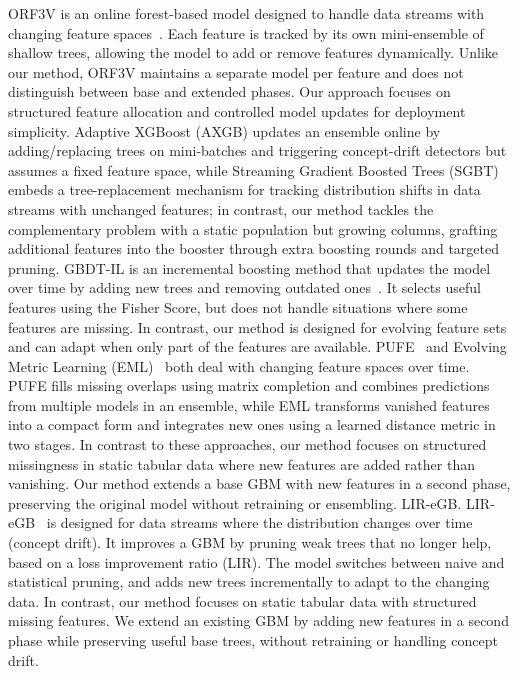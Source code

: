 \documentclass[sigconf]{acmart}
\begin{document}
\begin{itemize}
ORF3V is an online forest-based model designed to handle data streams with changing feature spaces~\cite{beyazit2019orf3v}. Each feature is tracked by its own mini-ensemble of shallow trees, allowing the model to add or remove features dynamically. Unlike our method, ORF3V maintains a separate model per feature and does not distinguish between base and extended phases. Our approach focuses on structured feature allocation and controlled model updates for deployment simplicity.
Adaptive XGBoost (AXGB)\cite{montiel2020axgb} updates an ensemble online by adding/replacing trees on mini-batches and triggering concept-drift detectors but assumes a fixed feature space, while Streaming Gradient Boosted Trees (SGBT)\cite{vaquet2022sgbt} embeds a tree-replacement mechanism for tracking distribution shifts in data streams with unchanged features; in contrast, our method tackles the complementary problem with a static population but growing columns, grafting additional features into the booster through extra boosting rounds and targeted pruning.
GBDT-IL is an incremental boosting method that updates the model over time by adding new trees and removing outdated ones~\cite{chen2024gbdtil}. It selects useful features using the Fisher Score, but does not handle situations where some features are missing. In contrast, our method is designed for evolving feature sets and can adapt when only part of the features are available.
PUFE~\cite{he2021pufe} and Evolving Metric Learning (EML)~\cite{dong2021eml} both deal with changing feature spaces over time. PUFE fills missing overlaps using matrix completion and combines predictions from multiple models in an ensemble, while EML transforms vanished features into a compact form and integrates new ones using a learned distance metric in two stages. In contrast to these approaches, our method focuses on structured missingness in static tabular data where new features are added rather than vanishing. Our method extends a base GBM with new features in a second phase, preserving the original model without retraining or ensembling.
LIR-eGB. LIR-eGB~\cite{wang2023liregb} is designed for data streams where the distribution changes over time (concept drift). It improves a GBM by pruning weak trees that no longer help, based on a loss improvement ratio (LIR). The model switches between naive and statistical pruning, and adds new trees incrementally to adapt to the changing data. In contrast, our method focuses on static tabular data with structured missing features. We extend an existing GBM by adding new features in a second phase while preserving useful base trees, without retraining or handling concept drift.

\end{itemize}
\end{document}
